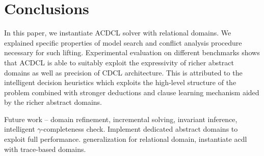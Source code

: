 \section{Conclusions}
In this paper, we instantiate ACDCL solver with relational domains.  We explained specific properties of model search and conflict analysis procedure necessary
for such lifting.  Experimental evaluation on different benchmarks shows that
ACDCL is able to suitably exploit the expressivity of richer
abstract domains as well as precision of CDCL architecture.
This is attributed to the intelligent decision heuristics
which exploits the high-level structure of the problem
combined with stronger deductions and clause learning
mechanism aided by the richer abstract domains.

Future work -- domain refinement, incremental solving, invariant inference, intelligent $\gamma$-completeness check. Implement dedicated abstract domains to exploit full performance.
generalization for relational domain, instantiate acdl with trace-based domains.
